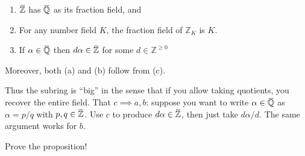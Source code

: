 \begin{proposition}[$\ff(\ZZ_K) = K$ ]

\envlist

\begin{enumerate}
\def\labelenumi{\alph{enumi}.}
\tightlist
\item
  \(\mkern 1.5mu\overline{\mkern-1.5mu{\mathbb{Z}}\mkern-1.5mu}\mkern 1.5mu\)
  has
  \(\mkern 1.5mu\overline{\mkern-1.5mu{\mathbb{Q}}\mkern-1.5mu}\mkern 1.5mu\)
  as its fraction field, and
\item
  For any number field \(K\), the fraction field of \({\mathbb{Z}}_K\)
  is \(K\).
\item
  If
  \(\alpha\in \mkern 1.5mu\overline{\mkern-1.5mu{\mathbb{Q}}\mkern-1.5mu}\mkern 1.5mu\)
  then
  \(d \alpha\in \mkern 1.5mu\overline{\mkern-1.5mu{\mathbb{Z}}\mkern-1.5mu}\mkern 1.5mu\)
  for some \(d\in {\mathbb{Z}}^{\geq 0}\)
\end{enumerate}

Moreover, both (a) and (b) follow from (c).

\end{proposition}

\begin{remark}

Thus the subring is ``big'' in the sense that if you allow taking
quotients, you recover the entire field. That \(c\implies a,b\): suppose
you want to write
\(\alpha \in \mkern 1.5mu\overline{\mkern-1.5mu{\mathbb{Q}}\mkern-1.5mu}\mkern 1.5mu\)
as \(\alpha=p/q\) with
\(p,q \in \mkern 1.5mu\overline{\mkern-1.5mu{\mathbb{Z}}\mkern-1.5mu}\mkern 1.5mu\).
Use \(c\) to produce
\(d\alpha\in \mkern 1.5mu\overline{\mkern-1.5mu{\mathbb{Z}}\mkern-1.5mu}\mkern 1.5mu\),
then just take \(d\alpha /d\). The same argument works for \(b\).

\end{remark}

\begin{exercise}[?]

Prove the proposition!

\end{exercise}


